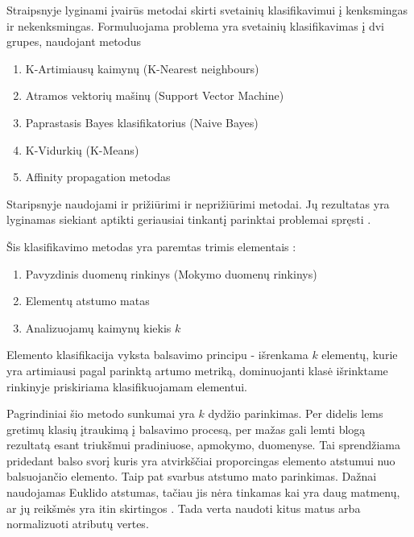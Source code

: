 
Straipsnyje lyginami įvairūs metodai skirti svetainių klasifikavimui į kenksmingas ir nekenksmingas.
Formuluojama problema yra svetainių klasifikavimas į dvi grupes, naudojant metodus \cite{comp}
\begin{enumerate}
 \item K-Artimiausų kaimynų (K-Nearest neighbours)
 \item Atramos vektorių mašinų (Support Vector Machine)
 \item Paprastasis Bayes klasifikatorius (Naive Bayes)
 \item K-Vidurkių (K-Means)
 \item Affinity propagation metodas
\end{enumerate}


Staripsnyje naudojami ir prižiūrimi ir neprižiūrimi metodai. Jų rezultatas yra lyginamas siekiant aptikti geriausiai tinkantį parinktai problemai spręsti \cite{comp}.

Šis klasifikavimo metodas yra paremtas trimis elementais \cite{Wu2008}:
\begin{enumerate}
    \item Pavyzdinis duomenų rinkinys (Mokymo duomenų rinkinys)
    \item Elementų atstumo matas
    \item Analizuojamų kaimynų kiekis $k$
\end{enumerate}
Elemento klasifikacija vyksta balsavimo principu - išrenkama $k$ elementų, kurie yra artimiausi pagal parinktą artumo metriką, dominuojanti klasė išrinktame rinkinyje priskiriama klasifikuojamam elementui.

Pagrindiniai šio metodo sunkumai yra $k$ dydžio parinkimas. Per didelis lems gretimų klasių įtraukimą į balsavimo procesą, per mažas gali lemti blogą rezultatą esant triukšmui pradiniuose, apmokymo, duomenyse. Tai sprendžiama pridedant balso svorį \cite{Wu2008} kuris yra atvirkščiai proporcingas elemento atstumui nuo balsuojančio elemento. Taip pat svarbus atstumo mato parinkimas. Dažnai naudojamas Euklido atstumas, tačiau jis nėra tinkamas kai yra daug matmenų, ar jų reikšmės yra itin skirtingos \cite{Wu2008}. Tada verta naudoti kitus matus arba normalizuoti atributų vertes.

